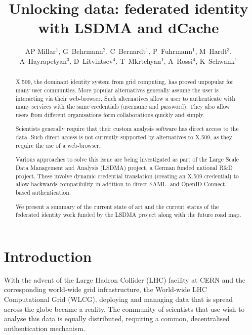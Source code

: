 \documentclass[a4paper]{jpconf}
\begin{document}
\title{Unlocking data: federated identity with LSDMA and dCache}

\author{AP Millar$^1$, G~Behrmann$^2$, C~Bernardt$^1$, P~Fuhrmann$^1$,
  M~Hardt$^3$, A~Hayrapetyan$^3$, D~Litvintsev$^4$, T~Mkrtchyan$^1$,
  A~Rossi$^4$, K~Schwank$^1$}

\address{$^1$ IT Dept., DESY, Notkestrasse 85, Hamburg, Germany}
\address{$^2$ NORDUnet, Copenhagen, Denmark}
\address{$^3$ KIT}
\address{$^4$ Fermilab, Chicago, IL, USA}


\begin{abstract}
X.509, the dominant identity system from grid computing, has proved
unpopular for many user communties. More popular alternatives
generally assume the user is interacting via their web-browser. Such
alternatives allow a user to authenticate with many services with the
same credentials (username and password). They also allow users from
different organisations form collaborations quickly and simply.

Scientists generally require that their custom analysis software has
direct access to the data. Such direct access is not currently
supported by alternatives to X.509, as they require the use of a
web-browser.

Various approaches to solve this issue are being investigated as part
of the Large Scale Data Management and Analysis (LSDMA) project, a
German funded national R\&D project. These involve dynamic credential
translation (creating an X.509 credential) to allow backwards
compatibility in addition to direct SAML- and OpenID Connect-based
authentication.

We present a summary of the current state of art and the current
status of the federated identity work funded by the LSDMA project
along with the future road map.
\end{abstract}

\section{Introduction}

With the advent of the Large Hadron Collider (LHC) facility at CERN
and the corresponding world-wide grid infrastructure, the World-wide
LHC Computational Grid (WLCG), deploying and managing data that is
spread across the globe became a reality.  The community of scientists
that use wish to analyse this data is equally distributed, requiring a
common, decentralised authentication mechanism.
\end{document}
